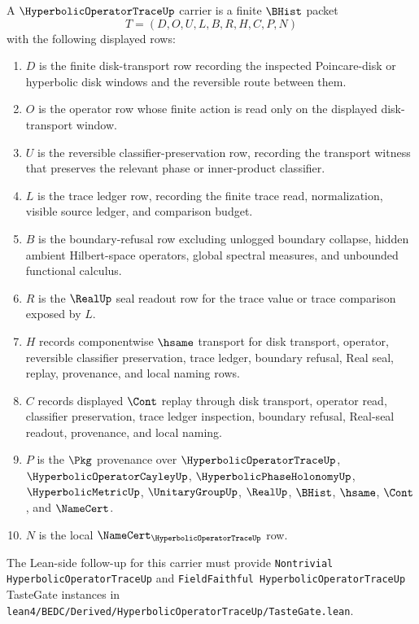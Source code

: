 \begin{definition}
\label{def:hyperbolic-operator-trace-carrier}
A $\HyperbolicOperatorTraceUp$ carrier is a finite $\BHist$ packet
$$
T=(D,O,U,L,B,R,H,C,P,N)
$$
with the following displayed rows:
\begin{enumerate}
\item $D$ is the finite disk-transport row recording the inspected Poincare-disk or hyperbolic disk windows and the reversible route between them.
\item $O$ is the operator row whose finite action is read only on the displayed disk-transport window.
\item $U$ is the reversible classifier-preservation row, recording the transport witness that preserves the relevant phase or inner-product classifier.
\item $L$ is the trace ledger row, recording the finite trace read, normalization, visible source ledger, and comparison budget.
\item $B$ is the boundary-refusal row excluding unlogged boundary collapse, hidden ambient Hilbert-space operators, global spectral measures, and unbounded functional calculus.
\item $R$ is the $\RealUp$ seal readout row for the trace value or trace comparison exposed by $L$.
\item $H$ records componentwise $\hsame$ transport for disk transport, operator, reversible classifier preservation, trace ledger, boundary refusal, Real seal, replay, provenance, and local naming rows.
\item $C$ records displayed $\Cont$ replay through disk transport, operator read, classifier preservation, trace ledger inspection, boundary refusal, Real-seal readout, provenance, and local naming.
\item $P$ is the $\Pkg$ provenance over $\HyperbolicOperatorTraceUp$, $\HyperbolicOperatorCayleyUp$, $\HyperbolicPhaseHolonomyUp$, $\HyperbolicMetricUp$, $\UnitaryGroupUp$, $\RealUp$, $\BHist$, $\hsame$, $\Cont$, and $\NameCert$.
\item $N$ is the local $\NameCert_{\HyperbolicOperatorTraceUp}$ row.
\end{enumerate}
The Lean-side follow-up for this carrier must provide \texttt{Nontrivial HyperbolicOperatorTraceUp} and \texttt{FieldFaithful HyperbolicOperatorTraceUp} TasteGate instances in \texttt{lean4/BEDC/Derived/HyperbolicOperatorTraceUp/TasteGate.lean}.
\end{definition}

